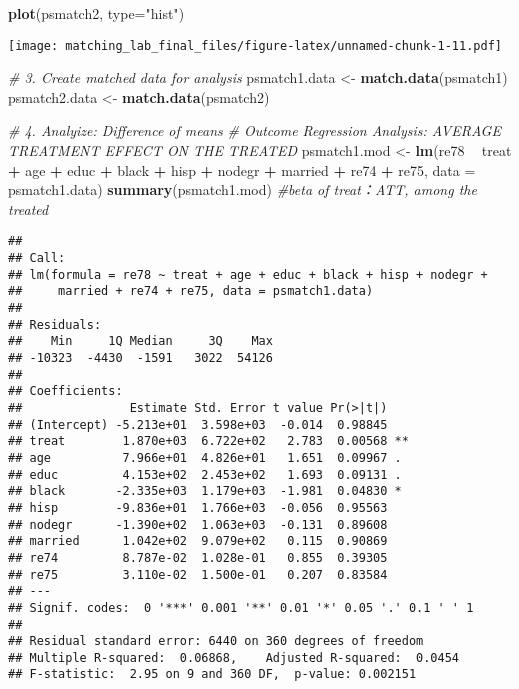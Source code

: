 \documentclass[]{article}
\newenvironment{Shaded}{\begin{snugshade}}{\end{snugshade}}
\newcommand{\CommentTok}[1]{\textcolor[rgb]{0.56,0.35,0.01}{\textit{#1}}}
\newcommand{\DataTypeTok}[1]{\textcolor[rgb]{0.13,0.29,0.53}{#1}}
\newcommand{\KeywordTok}[1]{\textcolor[rgb]{0.13,0.29,0.53}{\textbf{#1}}}
\newcommand{\NormalTok}[1]{#1}
\newcommand{\OperatorTok}[1]{\textcolor[rgb]{0.81,0.36,0.00}{\textbf{#1}}}
\newcommand{\StringTok}[1]{\textcolor[rgb]{0.31,0.60,0.02}{#1}}
\begin{document}
\begin{Shaded}
\begin{Highlighting}[]
\KeywordTok{plot}\NormalTok{(psmatch2, }\DataTypeTok{type=}\StringTok{"hist"}\NormalTok{)}
\end{Highlighting}
\end{Shaded}

\texttt{[image: matching\_lab\_final\_files/figure-latex/unnamed-chunk-1-11.pdf]}

\begin{Shaded}
\begin{Highlighting}[]
\CommentTok{# 3. Create matched data for analysis}
\NormalTok{psmatch1.data <-}\StringTok{ }\KeywordTok{match.data}\NormalTok{(psmatch1)}
\NormalTok{psmatch2.data <-}\StringTok{ }\KeywordTok{match.data}\NormalTok{(psmatch2)}


\CommentTok{# 4. Analyize: Difference of means}
\CommentTok{# Outcome Regression Analysis: AVERAGE TREATMENT EFFECT ON THE TREATED}
\NormalTok{psmatch1.mod <-}\StringTok{ }\KeywordTok{lm}\NormalTok{(re78 }\OperatorTok{~}\StringTok{ }\NormalTok{treat }\OperatorTok{+}\StringTok{ }\NormalTok{age }\OperatorTok{+}\StringTok{ }\NormalTok{educ }\OperatorTok{+}\StringTok{ }\NormalTok{black }\OperatorTok{+}\StringTok{ }\NormalTok{hisp }\OperatorTok{+}\StringTok{ }\NormalTok{nodegr }\OperatorTok{+}\StringTok{ }\NormalTok{married }\OperatorTok{+}\StringTok{ }\NormalTok{re74 }\OperatorTok{+}\StringTok{ }\NormalTok{re75, }
                   \DataTypeTok{data =}\NormalTok{ psmatch1.data)}
\KeywordTok{summary}\NormalTok{(psmatch1.mod)  }\CommentTok{#beta of treat：ATT, among the treated}
\end{Highlighting}
\end{Shaded}

\begin{verbatim}
## 
## Call:
## lm(formula = re78 ~ treat + age + educ + black + hisp + nodegr + 
##     married + re74 + re75, data = psmatch1.data)
## 
## Residuals:
##    Min     1Q Median     3Q    Max 
## -10323  -4430  -1591   3022  54126 
## 
## Coefficients:
##               Estimate Std. Error t value Pr(>|t|)   
## (Intercept) -5.213e+01  3.598e+03  -0.014  0.98845   
## treat        1.870e+03  6.722e+02   2.783  0.00568 **
## age          7.966e+01  4.826e+01   1.651  0.09967 . 
## educ         4.153e+02  2.453e+02   1.693  0.09131 . 
## black       -2.335e+03  1.179e+03  -1.981  0.04830 * 
## hisp        -9.836e+01  1.766e+03  -0.056  0.95563   
## nodegr      -1.390e+02  1.063e+03  -0.131  0.89608   
## married      1.042e+02  9.079e+02   0.115  0.90869   
## re74         8.787e-02  1.028e-01   0.855  0.39305   
## re75         3.110e-02  1.500e-01   0.207  0.83584   
## ---
## Signif. codes:  0 '***' 0.001 '**' 0.01 '*' 0.05 '.' 0.1 ' ' 1
## 
## Residual standard error: 6440 on 360 degrees of freedom
## Multiple R-squared:  0.06868,    Adjusted R-squared:  0.0454 
## F-statistic:  2.95 on 9 and 360 DF,  p-value: 0.002151
\end{verbatim}
\end{document}
